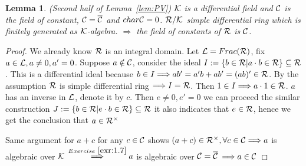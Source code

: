 \documentclass[11pt]{article}
\newtheorem{lemma}[thm]{Lemma}
\newcommand{\calc}{{\cal C}}
\newcommand{\calk}{{\cal K}}
\newcommand{\call}{{\cal L}}
\newcommand{\calr}{{\cal R}}
\newcommand{\Lrta}{\Longrightarrow}
\begin{document}
\begin{lemma}(Second half of Lemma~\ref{lem:PV})
$\calk$ is a differential field and $\calc$ is the field of constant, $\calc=\overline{\calc}$ and $char \calc=0$. $\calr/\calk$ simple differential ring which is finitely generated as $\calk$-algebra. $\Lrta $ the field of constants of $\calr$ is $\calc$.
\end{lemma}
\begin{proof} We already know $\calr$ is an integral domain.
Let $\call=Frac(\calr)$, fix $a\in \call, a\neq 0, a'=0$. Suppose $a\notin \calc$, consider the ideal $I:=\{b\in \calr|a\cdot b\in \calr\}\subseteq \calr$. This is a differential ideal because $b\in I\Lrta a b'=a'b+ab'=(ab)'\in \calr$. By the assumption $\calr$ is simple differential ring $\Lrta I=\calr$. Then $1\in I\Lrta a\cdot 1\in \calr$. $a$ has an inverse in $\call$, denote it by $c$. Then $e\neq 0,e'=0$ we can proceed the similar construction $J:=\{b\in \calr|e\cdot b\in \calr\}\subseteq \calr$ it also indicates that $e\in \calr$, hence we get the conclusion that $a\in \calr^\times$

Same argument for $a+c$ for any $c\in \calc$ shows 
$(a+c)\in \calr^\times,\forall c\in \calc\Lrta a$ is algebraic over $\calk$ $\overset{Exercise~\ref{exr:1.7}}{\Lrta} a $ is algebraic over $\calc=\overline{\calc}$ $\Lrta a\in \calc$
\end{proof}
\end{document}
